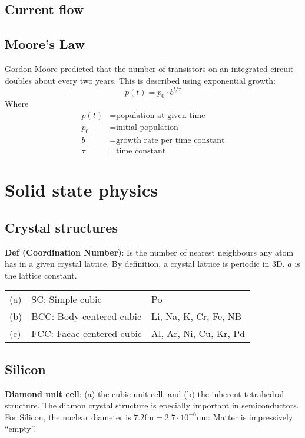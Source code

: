 \documentclass[a4paper, fontsize=8pt, landscape, DIV=1]{scrartcl}
\begin{document}
\begin{multicols*}{4}
    \subsection{Current flow}
    
    \subsection{Moore's Law}
    Gordon Moore predicted that the number of transistors on an integrated circuit doubles about every two years. This is described using exponential growth:
    \[p(t) = p_0 \cdot b^{t/\tau}\]
    Where
    \begin{align*}
      p(t) &= \text{population at given time} \\
      p_0 &= \text{initial population} \\
      b &= \text{growth rate per time constant} \\
      \tau &= \text{time constant}
    \end{align*}

  \section{Solid state physics}
  \subsection{Crystal structures}
  \textbf{Def (Coordination Number)}: Is the number of nearest neighbours any atom has in a given crystal lattice. By definition, a crystal lattice is periodic in 3D. $a$ is the lattice constant.

  \begin{tabular}[h]{l l p{1.5cm}}
    (a) & SC: Simple cubic & Po \\
    (b) & BCC: Body-centered cubic & Li, Na, K, Cr, Fe, NB \\
    (c) & FCC: Facae-centered cubic & Al, Ar, Ni, Cu, Kr, Pd \\
  \end{tabular}

  \subsection{Silicon}
  \textbf{Diamond unit cell}: (a) the cubic unit cell, and (b) the inherent tetrahedral structure. The diamon crystal structure is epecially important in semiconductors. For Silicon, the nuclear diameter is $7.2\text{fm} = 2.7\cdot 10^{-6}\text{nm}$: Matter is impressively ``empty''.


\end{multicols*}
\end{document}
